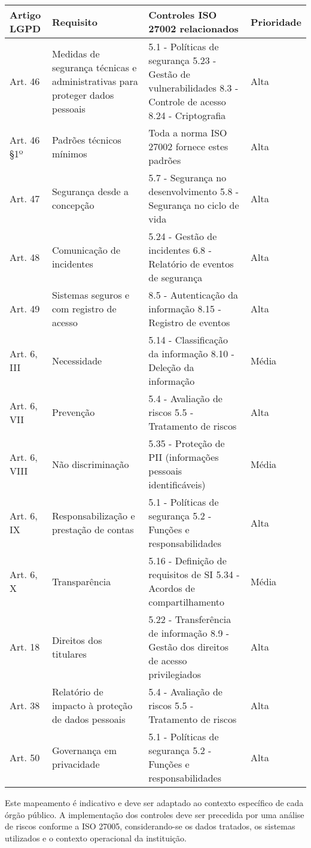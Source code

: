 \documentclass[12pt,a4paper]{report}
\begin{document}
\begin{longtable}{|p{2.5cm}|p{4cm}|p{6.5cm}|p{2cm}|}
\hline
\textbf{Artigo LGPD} & \textbf{Requisito} & \textbf{Controles ISO 27002 relacionados} & \textbf{Prioridade} \\
\hline \hline
Art. 46 & Medidas de segurança técnicas e administrativas para proteger dados pessoais & 5.1 - Políticas de segurança
5.23 - Gestão de vulnerabilidades
8.3 - Controle de acesso
8.24 - Criptografia & Alta \\
\hline
Art. 46 §1º & Padrões técnicos mínimos & Toda a norma ISO 27002 fornece estes padrões & Alta \\
\hline
Art. 47 & Segurança desde a concepção & 5.7 - Segurança no desenvolvimento
5.8 - Segurança no ciclo de vida & Alta \\
\hline
Art. 48 & Comunicação de incidentes & 5.24 - Gestão de incidentes
6.8 - Relatório de eventos de segurança & Alta \\
\hline
Art. 49 & Sistemas seguros e com registro de acesso & 8.5 - Autenticação da informação
8.15 - Registro de eventos & Alta \\
\hline
Art. 6, III & Necessidade & 5.14 - Classificação da informação
8.10 - Deleção da informação & Média \\
\hline
Art. 6, VII & Prevenção & 5.4 - Avaliação de riscos
5.5 - Tratamento de riscos & Alta \\
\hline
Art. 6, VIII & Não discriminação & 5.35 - Proteção de PII (informações pessoais identificáveis) & Média \\
\hline
Art. 6, IX & Responsabilização e prestação de contas & 5.1 - Políticas de segurança
5.2 - Funções e responsabilidades & Alta \\
\hline
Art. 6, X & Transparência & 5.16 - Definição de requisitos de SI
5.34 - Acordos de compartilhamento & Média \\
\hline
Art. 18 & Direitos dos titulares & 5.22 - Transferência de informação
8.9 - Gestão dos direitos de acesso privilegiados & Alta \\
\hline
Art. 38 & Relatório de impacto à proteção de dados pessoais & 5.4 - Avaliação de riscos
5.5 - Tratamento de riscos & Alta \\
\hline
Art. 50 & Governança em privacidade & 5.1 - Políticas de segurança
5.2 - Funções e responsabilidades & Alta \\
\hline
\end{longtable}

\begin{notebox}
Este mapeamento é indicativo e deve ser adaptado ao contexto específico de cada órgão público. A implementação dos controles deve ser precedida por uma análise de riscos conforme a ISO 27005, considerando-se os dados tratados, os sistemas utilizados e o contexto operacional da instituição.
\end{notebox}
\end{document}
